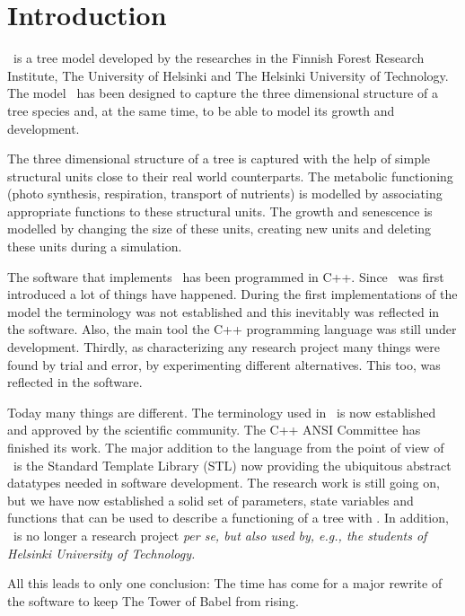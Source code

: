 \chapter{Introduction}

\lignum\ is a tree model developed by the researches in the  Finnish
Forest Research Institute, The University of Helsinki and The Helsinki
University of  Technology.   The model \lignum\  has  been designed to
capture the three dimensional structure of  a tree species and, at the
same time, to be able to model its growth and development.

The three dimensional structure of a tree is captured with the help of
simple structural  units close to their  real  world counterparts. The
metabolic  functioning (photo  synthesis,  respiration,  transport  of
nutrients) is modelled by  associating appropriate functions to  these
structural units.  The growth and  senescence is  modelled by changing
the size of  these units, creating  new units and deleting these units
during a simulation.

The  software  that implements \lignum\  has   been programmed in C++.
Since   \lignum\   was      first    introduced  \cite{salminen:omt94,
perttunen:aob96}  a lot  of things   have  happened. During the  first
implementations of the model  the terminology was not  established and
this inevitably was reflected in the software. Also, the main tool the
C++ programming  language  was still  under development.   Thirdly, as
characterizing any  research project many things  were found  by trial
and  error, by experimenting    different alternatives. This  too, was
reflected in the software.

Today many things are different.   The terminology used in \lignum\ is
now established and approved by the scientific community. The C++ ANSI
Committee has finished  its work.  The major addition  to the language
from the  point of view of  \lignum\ is the  Standard Template Library
(STL)  now  providing  the  ubiquitous abstract  datatypes  needed  in
software development.   The research  work is still  going on,  but we
have now  established a solid  set of parameters, state  variables and
functions that can be used to describe a functioning of a tree with
\lignum. In addition, \lignum\ is no longer a research project \it per
se\rm, but also used by, e.g.,  the students of Helsinki University of
Technology.

All this leads to only one  conclusion: The time has  come for a major
rewrite of the software to keep The Tower of Babel from rising.

